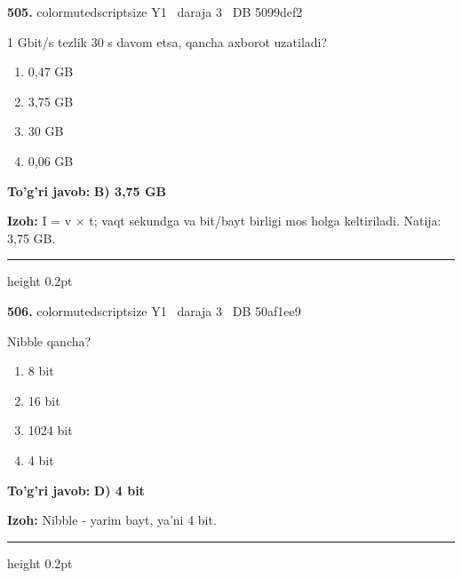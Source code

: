 \documentclass[10pt,a4paper,oneside]{article}
\begin{document}
\noindent\textbf{\color{ink}505.}  {color{muted}scriptsize Y1 \textbullet\ daraja 3 \textbullet\ DB 5099def2}
\par
1 Gbit/s tezlik 30 s davom etsa, qancha axborot uzatiladi?
\begin{enumerate}[label=\Alph*),leftmargin=9mm]
\item 0,47 GB
\item 3,75 GB
\item 30 GB
\item 0,06 GB
\end{enumerate}
\begin{tcolorbox}[enhanced,breakable,colback=teal!4,colframe=teal!50!black,boxrule=0.5pt,arc=1.1mm,left=3mm,right=3mm,top=1.7mm,bottom=1.7mm,before skip=2mm,after skip=2mm]
\textbf{\color{teal}To'g'ri javob:} \textbf{B) 3,75 GB}
\par\smallskip
\textbf{Izoh:} I = v \ensuremath{\times} t; vaqt sekundga va bit/bayt birligi mos holga keltiriladi. Natija: 3,75 GB.
\end{tcolorbox}
\vspace{2mm}\hrule height 0.2pt \vspace{3mm}

\noindent\textbf{\color{ink}506.}  {color{muted}scriptsize Y1 \textbullet\ daraja 3 \textbullet\ DB 50af1ee9}
\par
Nibble qancha?
\begin{enumerate}[label=\Alph*),leftmargin=9mm]
\item 8 bit
\item 16 bit
\item 1024 bit
\item 4 bit
\end{enumerate}
\begin{tcolorbox}[enhanced,breakable,colback=teal!4,colframe=teal!50!black,boxrule=0.5pt,arc=1.1mm,left=3mm,right=3mm,top=1.7mm,bottom=1.7mm,before skip=2mm,after skip=2mm]
\textbf{\color{teal}To'g'ri javob:} \textbf{D) 4 bit}
\par\smallskip
\textbf{Izoh:} Nibble - yarim bayt, ya'ni 4 bit.
\end{tcolorbox}
\vspace{2mm}\hrule height 0.2pt \vspace{3mm}
\end{document}
